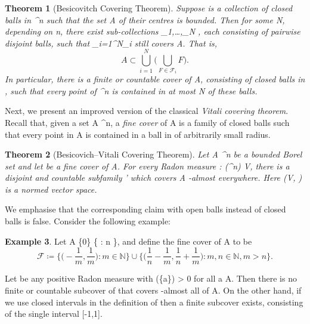 \documentclass[a4paper, 11pt]{article}
\theoremstyle{plain}
\newtheorem{theorem}{Theorem}[section]
\theoremstyle{definition}
\newtheorem{example}[theorem]{Example}
\theoremstyle{remark}
\newcommand{\norm}[1]{\left\lVert#1\right\rVert}
\numberwithin{equation}{subsection}
\def\({}
\def\){}
\begin{document}
\begin{theorem}[Besicovitch Covering Theorem]
Suppose \(\) is a collection of closed balls in \(^n\) such that the set \(A\) of their centres is bounded. Then for some \(N\), depending on \(n\), there exist sub-collections \(_1,\ldots,_N \subset {}\), each consisting of pairwise disjoint balls, such that \(\bigcup_{i=1}^{N}_i\) still covers \(A\). That is,
\begin{equation}
A \subset \bigcup_{i=1}^{N}\biggl(\bigcup_{F \in \mathcal{F}_i}F\biggr).
\end{equation}
In particular, there is a finite or countable cover of \(A\), consisting of closed balls in \(\), such that every point of \(^{n}\) is contained in at most \(N\) of these balls.
\end{theorem}

Next, we present an improved version of the classical \emph{Vitali covering theorem}. Recall that, given a set \(A \subset {}^{n}\), a \emph{fine cover} of \(A\) is a family \(\) of closed balls such that every point in \(A\) is contained in a ball in \(\) of arbitrarily small radius.

\begin{theorem}[Besicovich--Vitali Covering Theorem]
Let \(A \subset {}^{n}\) be a bounded Borel set and let \(\) be a fine cover of \(A\). For every Radon measure \(\mu : (^{n}) \rightarrow V\), there is a disjoint and countable subfamily \(' \subset {}\) which covers \(A\) \(\mu\)-almost everywhere. Here \((V, \norm{\cdot})\) is a normed vector space.
\end{theorem}

We emphasise that the corresponding claim with open balls instead of closed balls is false. Consider the following example:

\begin{example}
Let \(A \coloneq \{0\} \cup \left\{ : n \in {}\right\}\), and define the fine cover \(\) of \(A\) to be
\begin{equation}
\mathcal{F} \coloneq \biggl\{\biggl(-\frac{1}{m}, \frac{1}{m}\biggr) : m \in \mathbb{N}\biggr\} \cup \biggl\{\biggl(\frac{1}{n}-\frac{1}{m}, \frac{1}{n} + \frac{1}{m}\biggr) : m, n \in \mathbb{N}, m > n \biggr\}.
\end{equation}

Let \(\mu\) be any positive Radon measure with \(\mu(\{a\}) > 0\) for all \(a \in A\). Then there is no finite or countable subcover of \(\) that covers \(\mu\)-almost all of \(A\). On the other hand, if we use closed intervals in the definition of \(\) then a finite subcover exists, consisting of the single interval \([-1,1]\).
\end{example}
\end{document}
